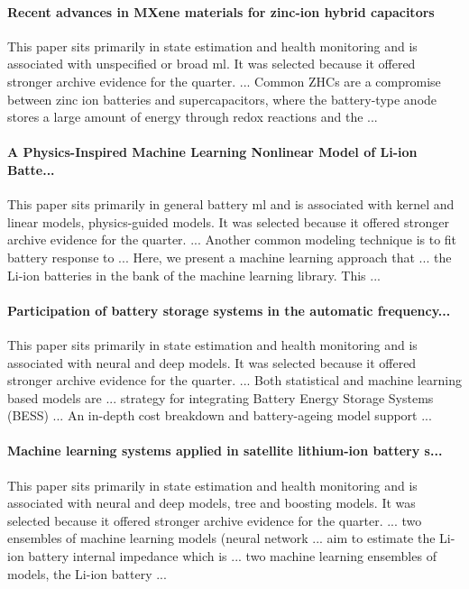 \documentclass[conference]{IEEEtran}
\begin{document}
\paragraph{Recent advances in MXene materials for zinc-ion hybrid capacitors} This paper sits primarily in state estimation and health monitoring and is associated with unspecified or broad ml. It was selected because it offered stronger archive evidence for the quarter. ... Common ZHCs are a compromise between zinc ion batteries and supercapacitors, where the battery-type anode stores a large amount of energy through redox reactions and the ... \cite{recentadvancesin2025}

\paragraph{A Physics-Inspired Machine Learning Nonlinear Model of Li-ion Batte...} This paper sits primarily in general battery ml and is associated with kernel and linear models, physics-guided models. It was selected because it offered stronger archive evidence for the quarter. ... Another common modeling technique is to fit battery response to ... Here, we present a machine learning approach that ... the Li-ion batteries in the bank of the machine learning library. This ... \cite{aphysicsinspired2023}

\paragraph{Participation of battery storage systems in the automatic frequency...} This paper sits primarily in state estimation and health monitoring and is associated with neural and deep models. It was selected because it offered stronger archive evidence for the quarter. ... Both statistical and machine learning based models are ... strategy for integrating Battery Energy Storage Systems (BESS) ... An in-depth cost breakdown and battery-ageing model support ... \cite{participationofbattery2020}

\paragraph{Machine learning systems applied in satellite lithium-ion battery s...} This paper sits primarily in state estimation and health monitoring and is associated with neural and deep models, tree and boosting models. It was selected because it offered stronger archive evidence for the quarter. ... two ensembles of machine learning models (neural network ... aim to estimate the Li-ion battery internal impedance which is ... two machine learning ensembles of models, the Li-ion battery ... \cite{machinelearningsystems2018}
\end{document}
